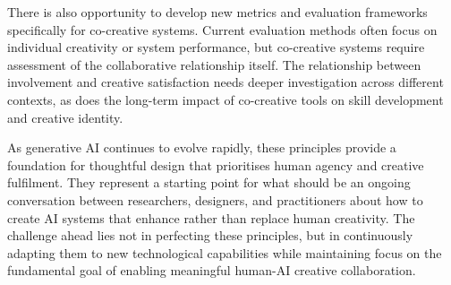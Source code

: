 There is also opportunity to develop new metrics and evaluation frameworks specifically for co-creative systems. Current evaluation methods often focus on individual creativity or system performance, but co-creative systems require assessment of the collaborative relationship itself. The relationship between involvement and creative satisfaction needs deeper investigation across different contexts, as does the long-term impact of co-creative tools on skill development and creative identity.

As generative AI continues to evolve rapidly, these principles provide a foundation for thoughtful design that prioritises human agency and creative fulfilment. They represent a starting point for what should be an ongoing conversation between researchers, designers, and practitioners about how to create AI systems that enhance rather than replace human creativity. The challenge ahead lies not in perfecting these principles, but in continuously adapting them to new technological capabilities while maintaining focus on the fundamental goal of enabling meaningful human-AI creative collaboration.
